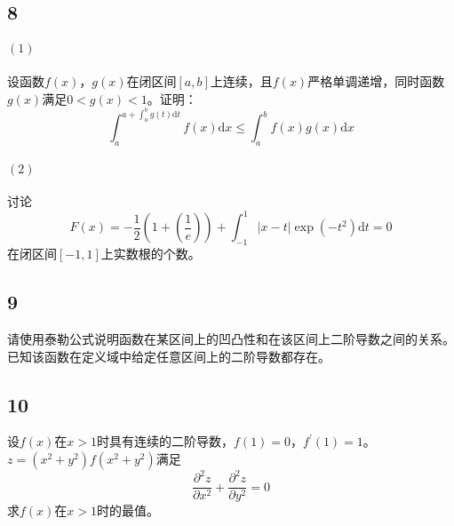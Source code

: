 \documentclass[a4paper,12pt]{article}
\begin{document}
\subsection*{8}
\noindent\paragraph{$\left(1\right)$}设函数$f(x)$，$g(x)$在闭区间$\left[a,b\right]$上连续，且$f(x)$严格单调递增，同时函数$g(x)$满足$0<g(x)<1$。证明：
\begin{equation*}
	\int_{a}^{a+\int_{a}^{b}g(t)\mathrm{d}t}f(x)\mathrm{d}x\leq\int_{a}^{b}f(x)g(x)\mathrm{d}x
\end{equation*}

\noindent\paragraph{$\left(2\right)$}
讨论\begin{equation*}
	F\left(x\right)=-\frac{1}{2}\left(1+\left(\frac{1}{e}\right)\right)+\int_{-1}^{1}|x-t|\exp(-t^2)\mathrm{d}t=0
\end{equation*}
在闭区间$\left[-1,1\right]$上实数根的个数。
\subsection*{9}\noindent 请使用泰勒公式说明函数在某区间上的凹凸性和在该区间上二阶导数之间的关系。已知该函数在定义域中给定任意区间上的二阶导数都存在。
\subsection*{10}
\noindent 设$f(x)$在$x>1$时具有连续的二阶导数，$f(1)=0$，$f^{\prime}(1)=1$。$z=\left(x^2+y^2\right)f\left(x^2+y^2\right)$满足
\begin{equation*}
	\frac{\partial^2 z}{\partial x^2}+\frac{\partial^2 z}{\partial y^2}=0
\end{equation*}
求$f(x)$在$x>1$时的最值。
\end{document}
